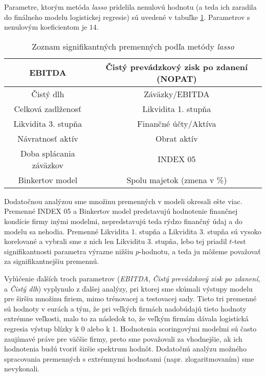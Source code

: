 Parametre, ktorým metóda \emph{lasso} pridelila nenulovú hodnotu (a teda ich zaradila do finálneho modelu logistickej regresie) sú uvedené v tabuľke \ref{lasso tabulka vsetky parametre}.
Parametrov s nenulovým koeficientom je \(14\).

\begin{table}
    \begin{tabular}{ |c|c| }
        \hline
        EBITDA & Čistý prevádzkový zisk po zdanení (NOPAT) \\
        \hline
        Čistý dlh & Záväzky/EBITDA \\
        \hline
        Celková zadlženosť & Likvidita 1. stupňa\\
        \hline
        Likvidita 3. stupňa & Finančné účty/Aktíva \\
        \hline
        Návratnosť aktív & Obrat aktív \\
        \hline
        Doba splácania záväzkov & INDEX 05 \\
        \hline
        Binkertov model & Spolu majetok (zmena v \%) \\
        \hline
    \end{tabular}
    \caption{Zoznam signifikantných premenných podľa metódy \emph{lasso}}
    \label{lasso tabulka vsetky parametre}
\end{table}

Dodatočnou analýzou sme množinu premenných v modeli okresali ešte viac.
Premenné INDEX 05 a Binkertov model predstavujú hodnotenie finančnej kondície firmy inými modelmi, nepredstavujú teda rýdzo finančný údaj a do modelu sa nehodia.
Premenné Likvidita 1. stupňa a Likvidita 3. stupňa sú vysoko korelované a vybrali sme z nich len Likviditu 3. stupňa,
lebo tej priadil \(t\)-test signifikantnosti parametra výrazne nižšiu \(p\)-hodnotu, a teda ju môžeme považovať za signifikantnejšiu premennú.

Vylúčenie ďalších troch parametrov (\emph{EBITDA}, \emph{Čistý prevádzkový zisk po zdanení}, a \emph{Čistý dlh}) vyplynulo z ďalšej analýzy,
pri ktorej sme skúmali výstupy modelu pre širšiu množinu firiem, mimo trénovacej a testovacej sady.
Tieto tri premenné sú hodnoty v eurách a tým, že pri veľkých firmách nadobúdajú tieto hodnoty extrémne veľkosti,
malo to za následok to, že veľkým firmám dávala logistická regresia výstup blízky k \(0\) alebo k \(1\).
Hodnotenia scoringovými modelmi sú často zaujímavé práve pre väčšie firmy, preto sme považovali za vhodnejšie, ak ich hodnotenia budú tvoriť širšie spektrum hodnôt.
Dodatočnú analýzu možného spracovania premenných s extrémnymi hodnotami (napr. zlogaritmovaním) sme nevykonali.

